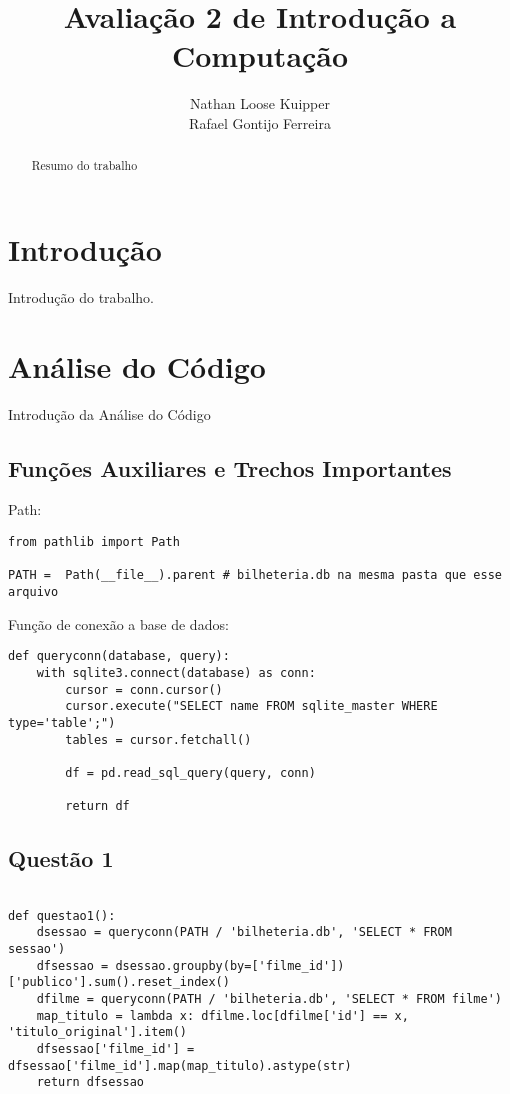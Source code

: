 \documentclass{article}
\title{Avaliação 2 de Introdução a Computação}
\author{Nathan Loose Kuipper \\ Rafael Gontijo Ferreira}
\begin{document}
\maketitle

\begin{abstract}
Resumo do trabalho %
\end{abstract}

\section{Introdução}
Introdução do trabalho.

\section{Análise do Código}
Introdução da Análise do Código
\subsection*{Funções Auxiliares e Trechos Importantes}

Path:
\begin{lstlisting}
from pathlib import Path

PATH =  Path(__file__).parent # bilheteria.db na mesma pasta que esse arquivo
\end{lstlisting}
Função de conexão a base de dados:
\begin{lstlisting}
def queryconn(database, query):
    with sqlite3.connect(database) as conn:
        cursor = conn.cursor()
        cursor.execute("SELECT name FROM sqlite_master WHERE type='table';")
        tables = cursor.fetchall()
      
        df = pd.read_sql_query(query, conn)
        
        return df
\end{lstlisting}
\subsection*{Questão 1}
\begin{lstlisting}

def questao1():
    dsessao = queryconn(PATH / 'bilheteria.db', 'SELECT * FROM sessao')
    dfsessao = dsessao.groupby(by=['filme_id'])['publico'].sum().reset_index()
    dfilme = queryconn(PATH / 'bilheteria.db', 'SELECT * FROM filme')
    map_titulo = lambda x: dfilme.loc[dfilme['id'] == x, 'titulo_original'].item()
    dfsessao['filme_id'] =  dfsessao['filme_id'].map(map_titulo).astype(str)
    return dfsessao
\end{lstlisting}
\end{document}
